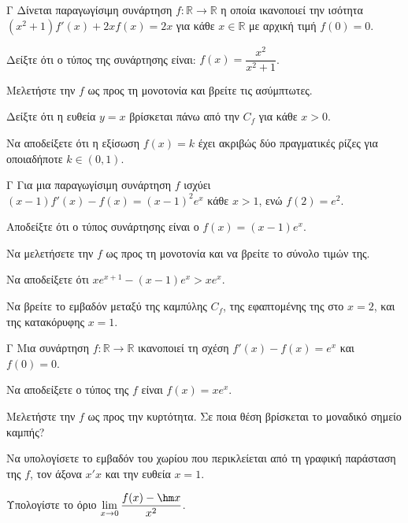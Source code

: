 \begin{thema}{Γ}
Δίνεται παραγωγίσιμη συνάρτηση $f : \mathbb{R} \to \mathbb{R}$ η οποία ικανοποιεί την ισότητα $(x^2+1) f'(x) + 2x f(x) = 2x$ για κάθε $x\in\mathbb{R}$  με αρχική τιμή $f(0) = 0$.
\begin{erwthma}
  \item Δείξτε ότι ο τύπος της συνάρτησης είναι: $f(x) = \dfrac{x^2}{x^2+1}$.
  \item Μελετήστε την $f$ ως προς τη μονοτονία και βρείτε τις ασύμπτωτες.
  \item Δείξτε ότι η ευθεία $y=x$ βρίσκεται πάνω από την $C_f$ για κάθε $x>0$.
  \item Να αποδείξετε ότι η εξίσωση $f(x) = k$ έχει ακριβώς δύο πραγματικές ρίζες για οποιαδήποτε $k \in (0, 1)$.
\end{erwthma}
\end{thema}

\begin{thema}{Γ}
Για μια παραγωγίσιμη συνάρτηση $f$ ισχύει $(x-1) f'(x) - f(x) = (x-1)^2 e^x$  κάθε $x > 1$, ενώ $f(2) = e^2$.
\begin{erwthma}
  \item Αποδείξτε ότι ο τύπος συνάρτησης είναι ο $f(x) = (x-1)e^x$.
  \item Να μελετήσετε την $f$ ως προς τη μονοτονία και να βρείτε το σύνολο τιμών της.
  \item Να αποδείξετε ότι $x e^{x+1} - (x-1)e^x > x e^x$.
  \item Να βρείτε το εμβαδόν μεταξύ της καμπύλης $C_f$, της εφαπτομένης της στο $x=2$, και της κατακόρυφης $x=1$.
\end{erwthma}
\end{thema}

\begin{thema}{Γ}
Μια συνάρτηση $f: \mathbb{R} \to \mathbb{R}$ ικανοποιεί τη σχέση $f'(x) - f(x) = e^x$ και $f(0) = 0$.
\begin{erwthma}
  \item Να αποδείξετε ο τύπος της $f$ είναι $f(x) = x e^x$.
  \item Μελετήστε την $f$ ως προς την κυρτότητα. Σε ποια θέση βρίσκεται το μοναδικό σημείο καμπής?
  \item Να υπολογίσετε το εμβαδόν του χωρίου που περικλείεται από τη γραφική παράσταση της $f$, τον άξονα $x'x$ και την ευθεία $x=1$.
  \item Υπολογίστε το όριο $\lim\limits_{x \to 0} \dfrac{f(x) - \hm x}{x^2}$.
\end{erwthma}
\end{thema}

